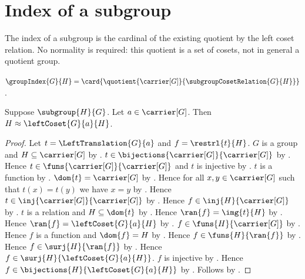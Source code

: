 



\section{Index of a subgroup}

The index of a subgroup is the cardinal of the existing quotient by the left
coset relation.  No normality is required: this quotient is a set of cosets,
not in general a quotient group.

\begin{definition}\label{group_index}
    $\groupIndex{G}{H}
        =\card{\quotient{\carrier[G]}{
            \subgroupCosetRelation{G}{H}}}$.
\end{definition}

\begin{theorem}\label{left_coset_equinumerous_subgroup}
    Suppose $\subgroup{H}{G}$.
    Let $a\in\carrier[G]$.
    Then $H\approx\leftCoset{G}{a}{H}$.
\end{theorem}
\begin{proof}
    Let $t=\LeftTranslation{G}{a}$ and $f=\restrl{t}{H}$.
    $G$ is a group and $H\subseteq\carrier[G]$ by
        .
    $t\in\bijections{\carrier[G]}{\carrier[G]}$ by
        .
    Hence $t\in\funs{\carrier[G]}{\carrier[G]}$ and
        $t$ is injective by .
    $t$ is a function by .
    $\dom{t}=\carrier[G]$ by .
    Hence for all $x,y\in\carrier[G]$ such that $t(x)=t(y)$
        we have $x=y$ by .
    Hence $t\in\inj{\carrier[G]}{\carrier[G]}$ by .
    Hence $f\in\inj{H}{\carrier[G]}$ by .
    $t$ is a relation and $H\subseteq\dom{t}$ by
        .
    Hence $\ran{f}=\img{t}{H}$ by .
    Hence $\ran{f}=\leftCoset{G}{a}{H}$ by .
    $f\in\funs{H}{\carrier[G]}$ by .
    Hence $f$ is a function and $\dom{f}=H$ by
        .
    Hence $f\in\funs{H}{\ran{f}}$ by
        .
    Hence $f\in\surj{H}{\ran{f}}$ by .
    Hence $f\in\surj{H}{\leftCoset{G}{a}{H}}$.
    $f$ is injective by .
    Hence $f\in\bijections{H}{\leftCoset{G}{a}{H}}$ by
        .
    Follows by .
\end{proof}

